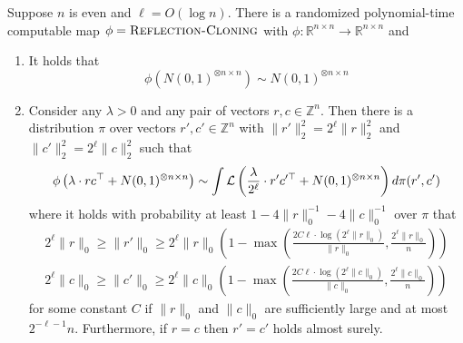 \begin{lemma} \label{lem:refc}
Suppose $n$ is even and $\ell = O(\log n)$. There is a randomized polynomial-time computable map $\phi = \textsc{Reflection-Cloning}$ with $\phi : \mathbb{R}^{n \times n} \to \mathbb{R}^{n \times n}$ and
\begin{enumerate}
\item It holds that
$$\phi\left(N(0, 1)^{\otimes n \times n}\right) \sim N(0, 1)^{\otimes n \times n}$$
\item Consider any $\lambda > 0$ and any pair of vectors $r, c \in \mathbb{Z}^n$. Then there is a distribution $\pi$ over vectors $r', c' \in \mathbb{Z}^n$ with $\| r' \|_2^2 = 2^\ell \| r \|_2^2$ and $\| c' \|_2^2 = 2^\ell \| c \|_2^2$ such that
$$\phi\left(\lambda \cdot r c^\top + N(0, 1)^{\otimes n \times n}\right) \sim \int \mathcal{L}\left( \frac{\lambda}{2^\ell} \cdot r' c'^\top + N(0, 1)^{\otimes n \times n} \right) d\pi(r', c')$$
where it holds with probability at least $1 - 4\| r \|_0^{-1} - 4\| c \|_0^{-1}$ over $\pi$ that
\begin{align*}
2^\ell \| r \|_0 \ge \| r' \|_0 \ge 2^\ell \| r \|_0 \left( 1 - \max\left(\frac{2C\ell \cdot \log (2^\ell \| r \|_0)}{\| r \|_0}, \frac{2^\ell \| r \|_0}{n}\right) \right) \\ 
2^\ell \| c \|_0 \ge \| c' \|_0 \ge 2^\ell \| c \|_0 \left( 1 - \max\left(\frac{2C\ell \cdot \log (2^\ell \| c \|_0)}{\| c \|_0}, \frac{2^\ell \| c \|_0}{n}\right) \right)
\end{align*}
for some constant $C$ if $\| r \|_0$ and $\| c \|_0$ are sufficiently large and at most $2^{-\ell-1} n$. Furthermore, if $r = c$ then $r' = c'$ holds almost surely.
\end{enumerate}
\end{lemma}

